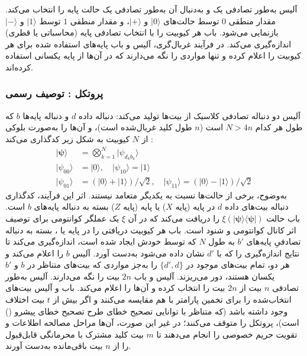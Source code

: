آلیس به‌طور تصادفی یک  و به‌دنبال آن به‌طور تصادفی یک حالت پایه را انتخاب می‌کند. مقدار منطقی $0$ توسط حالت‌های $|0\rangle$ و $|+\rangle$، و مقدار منطقی $1$ توسط $|1\rangle$ و $|-\rangle$ بازنمایی می‌شود. باب هر کیوبیت را با انتخاب تصادفی پایه (محاسباتی یا قطری) اندازه‌گیری می‌کند. در فرآیند غربال‌گری، آلیس و باب پایه‌های استفاده شده برای هر کیوبیت را اعلام کرده و تنها مواردی را نگه می‌دارند که در آن‌ها از پایه یکسانی استفاده کرده‌اند.






\subsubsection{پروتکل : توصیف رسمی}
\label{subsec:7-3-1-1}

آلیس دو دنباله تصادفی کلاسیک از بیت‌ها تولید می‌کند: دنباله داده $d$ و دنباله پایه‌ها $b$ که طول هر کدام $N > 4n$ است ($n$ طول کلید غربال‌شده است)، و آن‌ها را به‌صورت بلوکی از $N$ کیوبیت به شکل زیر کدگذاری می‌کند \cite{7-6}:
\begin{equation}
	\begin{aligned}
		|\bm{\psi}\rangle &= \bigotimes_{k=1}^N |\psi_{d_k b_k}\rangle \\
		|\psi_{00}\rangle &= |0\rangle, \quad |\psi_{10}\rangle = |1\rangle \\
		|\psi_{01}\rangle &= (|0\rangle + |1\rangle)/\sqrt{2}, \quad |\psi_{11}\rangle = (|0\rangle - |1\rangle)/\sqrt{2}
	\end{aligned}
	\label{eq:7-9}
\end{equation}
به‌وضوح، برخی از حالت‌ها نسبت به یکدیگر متعامد نیستند. اثر این فرآیند، کدگذاری دنباله بیت‌های داده $d$ در پایه  (پایه $X$) یا پایه  (پایه $Z$) بسته به دنباله پایه‌های $b$ است. باب حالت $\xi(|\bm{\psi}\rangle\langle\bm{\psi}|)$ را دریافت می‌کند که در آن $\xi$ یک عملگر کوانتومی برای توصیف اثر کانال کوانتومی و شنود است. باب هر کیوبیت دریافتی را در پایه  یا ، بسته به دنباله تصادفیِ پایه‌های $b'$ به طول $N$ که توسط خودش ایجاد شده است، اندازه‌گیری می‌کند تا نتایج اندازه‌گیری را که با $d'$ نشان داده می‌شود به‌دست آورد. آلیس $b$ را اعلام می‌کند و هر دو، تمام بیت‌های موجود در $\{d', d\}$ را به‌جز مواردی که بیت‌های متناظر در $b$ و $b'$ یکسان هستند، دور می‌ریزند. آلیس و باب $2n$ بیت را نگه می‌دارند. آلیس به‌طور تصادفی $n$ بیت از $2n$ بیت را انتخاب کرده و آن‌ها را اعلام می‌کند. باب و آلیس بیت‌های انتخاب‌شده را برای تخمین پارامتر با هم مقایسه می‌کنند و اگر بیش از $t$ بیت اختلاف وجود داشته باشد (که متناظر با توانایی تصحیح خطای طرح تصحیح خطای پیشرو () است)، پروتکل را متوقف می‌کنند؛ در غیر این صورت، آن‌ها مراحل مصالحه اطلاعات و تقویت حریم خصوصی را انجام می‌دهند تا $m$ بیت کلید مشترک با محرمانگی قابل‌قبول را از $n$ بیت باقی‌مانده به‌دست آورند.









